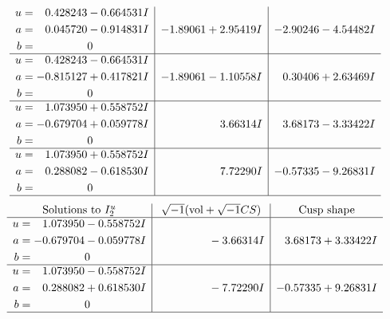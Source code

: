 \documentclass[1p]{elsarticle_modified}
\theoremstyle{definition}
\newcommand{\I}{\sqrt{-1}}
\begin{document}
$$\begin{array}{c|c|c}
\begin{aligned}
u &= \phantom{-}0.428243 - 0.664531 I \\
a &= \phantom{-}0.045720 - 0.914831 I \\
b &= \phantom{-0.000000 } 0\end{aligned}
 & -1.89061 + 2.95419 I & -2.90246 - 4.54482 I \\ \hline\begin{aligned}
u &= \phantom{-}0.428243 - 0.664531 I \\
a &= -0.815127 + 0.417821 I \\
b &= \phantom{-0.000000 } 0\end{aligned}
 & -1.89061 - 1.10558 I & \phantom{-}0.30406 + 2.63469 I \\ \hline\begin{aligned}
u &= \phantom{-}1.073950 + 0.558752 I \\
a &= -0.679704 + 0.059778 I \\
b &= \phantom{-0.000000 } 0\end{aligned}
 & \phantom{-0.000000 -}3.66314 I & \phantom{-}3.68173 - 3.33422 I \\ \hline\begin{aligned}
u &= \phantom{-}1.073950 + 0.558752 I \\
a &= \phantom{-}0.288082 - 0.618530 I \\
b &= \phantom{-0.000000 } 0\end{aligned}
 & \phantom{-0.000000 -}7.72290 I & -0.57335 - 9.26831 I\\
 \hline 
 \end{array}$$\newpage$$\begin{array}{c|c|c}  
\text{Solutions to }I^u_{2}& \I (\text{vol} + \sqrt{-1}CS) & \text{Cusp shape}\\
 \hline 
\begin{aligned}
u &= \phantom{-}1.073950 - 0.558752 I \\
a &= -0.679704 - 0.059778 I \\
b &= \phantom{-0.000000 } 0\end{aligned}
 & \phantom{-0.000000 } -3.66314 I & \phantom{-}3.68173 + 3.33422 I \\ \hline\begin{aligned}
u &= \phantom{-}1.073950 - 0.558752 I \\
a &= \phantom{-}0.288082 + 0.618530 I \\
b &= \phantom{-0.000000 } 0\end{aligned}
 & \phantom{-0.000000 } -7.72290 I & -0.57335 + 9.26831 I\\
 \hline 
 \end{array}$$\newpage\newpage\renewcommand{\arraystretch}{1}
\end{document}
